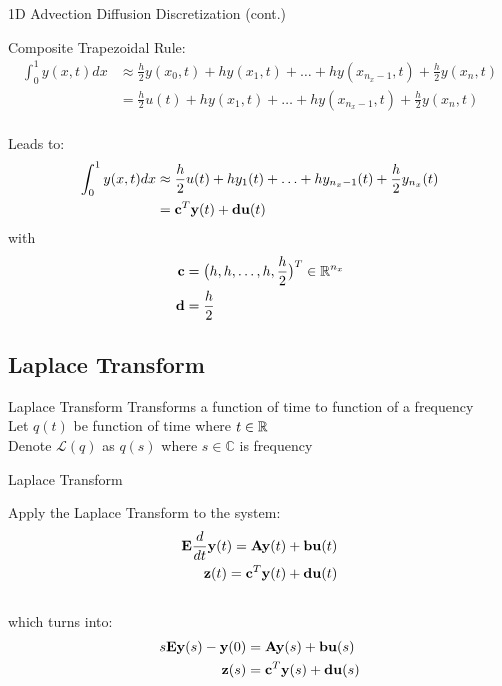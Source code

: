 
\begin{frame}{1D Advection Diffusion Discretization (cont.)}

Composite Trapezoidal Rule:
\begin{align*}
     \int_{0}^{1} y(x,t)dx & \approx \frac{h}{2} y(x_0,t) + hy(x_1,t) + \ldots + hy(x_{n_x -1},t) + \frac{h}{2} y(x_n,t)
     \\
     & = \frac{h}{2}u(t) + hy(x_1,t) + \ldots + hy(x_{n_x -1},t) + \frac{h}{2} y(x_n,t)\\
\end{align*}
    
Leads to:
\begin{align*}
     \int_{0}^{1} y(x,t)dx & \approx \frac{h}{2} u(t) + hy_1(t) + \ldots + hy_{n_x -1}(t) + \frac{h}{2} y_{n_x}(t)
     \\
     & = {\bf c}^{T} {\bf y}(t) + {\bf d}{\bf u}(t)\\
\end{align*}
with 
\begin{align*}
{\bf c} &=  \big( h,h,\ldots,h,\frac{h}{2} \big)^{T} \in \mathbb{R}^{n_x}\\
{\bf d} &= \frac{h}{2}
\end{align*}

\end{frame}

\subsection{Laplace Transform}

\begin{frame}{Laplace Transform}
Transforms a function of time to function of a frequency\\
\bigskip
Let $q(t)$ be function of time where $t \in \mathbb{R}$\\
\bigskip
Denote $\mathcal{L}(q)$ as $q(s)$ where $s \in \mathbb{C}$ is frequency
\end{frame}
\begin{frame}{Laplace Transform}

Apply the Laplace Transform to the system:
    \begin{align*}
            {\bf E}\frac{d}{dt} {\bf y}(t)  = {\mathbf A} {\bf y}(t) + {\bf b}{\bf u}(t)\\
            {\bf z}(t) = {\bf c}^T {\bf y}(t) + {\bf d}{\bf u}(t)
    \end{align*}
\\
which turns into:
\\
    \begin{align*}
        s{\bf E} {\bf y}(s) - {\bf y}(0) &= {\bf A} {\bf y}(s) + {\bf b}{\bf u}(s)\\
        {\bf z}(s) &= {\bf c}^T {\bf y}(s) + {\bf d} {\bf u}(s)
    \end{align*}

\end{frame}

